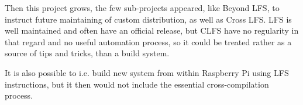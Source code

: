 \documentclass[printmode]{mgr}
\begin{document}
Then this project grows, the few sub-projects appeared, like Beyond LFS, to instruct future maintaining of custom distribution, as well as Cross LFS.
LFS is well maintained and often have an official release, but CLFS have no regularity in that regard and no useful automation process, so it could be treated rather as a source of tips and tricks, than a build system.

It is also possible to i.e. build new system from within Raspberry Pi using LFS instructions, but it then would not include the essential cross-compilation process.












\end{document}
